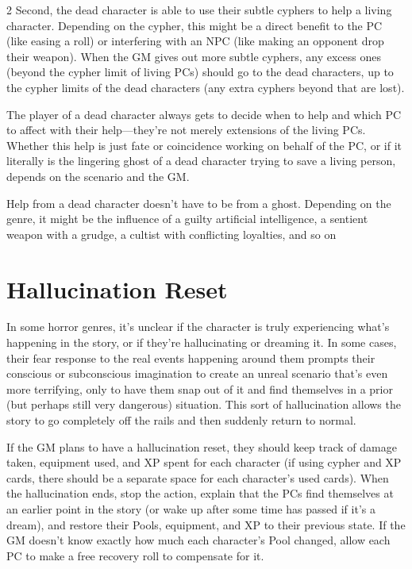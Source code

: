 \begin{multicols}{2}
Second, the dead character is able to use their subtle cyphers to help a living character. Depending on the cypher, this might be a direct benefit to the PC (like easing a roll) or interfering with an NPC (like making an opponent drop their weapon). When the GM gives out more subtle cyphers, any excess ones (beyond the cypher limit of living PCs) should go to the dead characters, up to the cypher limits of the dead characters (any extra cyphers beyond that are lost).

The player of a dead character always gets to decide when to help and which PC to affect with their help—they’re not merely extensions of the living PCs. Whether this help is just fate or coincidence working on behalf of the PC, or if it literally is the lingering ghost of a dead character trying to save a living person, depends on the scenario and the GM.

Help from a dead character doesn’t have to be from a ghost. Depending on the genre, it might be the influence of a guilty artificial intelligence, a sentient weapon with a grudge, a cultist with conflicting loyalties, and so on

\section{Hallucination Reset}

In some horror genres, it’s unclear if the character is truly experiencing what’s happening in the story, or if they’re hallucinating or dreaming it. In some cases, their fear response to the real events happening around them prompts their conscious or subconscious imagination to create an unreal scenario that’s even more terrifying, only to have them snap out of it and find themselves in a prior (but perhaps still very dangerous) situation. This sort of hallucination allows the story to go completely off the rails and then suddenly return to normal.

If the GM plans to have a hallucination reset, they should keep track of damage taken, equipment used, and XP spent for each character (if using cypher and XP cards, there should be a separate space for each character’s used cards). When the hallucination ends, stop the action, explain that the PCs find themselves at an earlier point in the story (or wake up after some time has passed if it’s a dream), and restore their Pools, equipment, and XP to their previous state. If the GM doesn’t know exactly how much each character’s Pool changed, allow each PC to make a free recovery roll to compensate for it.


\end{multicols}
